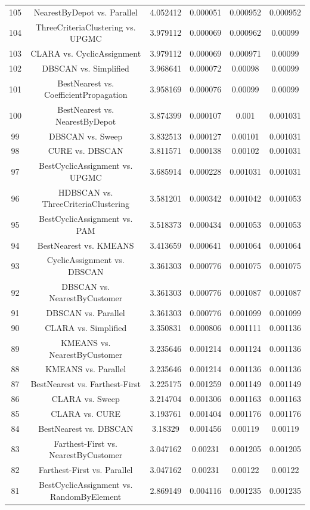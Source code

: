 \documentclass[a4paper,10pt]{article}
\begin{document}
\begin{landscape}
\begin{table}[!htp]
\begin{tabular}{cccccc}
105&NearestByDepot vs. Parallel&4.052412&0.000051&0.000952&0.000952\\
104&ThreeCriteriaClustering vs. UPGMC&3.979112&0.000069&0.000962&0.00099\\
103&CLARA vs. CyclicAssignment&3.979112&0.000069&0.000971&0.00099\\
102&DBSCAN vs. Simplified&3.968641&0.000072&0.00098&0.00099\\
101&BestNearest vs. CoefficientPropagation&3.958169&0.000076&0.00099&0.00099\\
100&BestNearest vs. NearestByDepot&3.874399&0.000107&0.001&0.001031\\
99&DBSCAN vs. Sweep&3.832513&0.000127&0.00101&0.001031\\
98&CURE vs. DBSCAN&3.811571&0.000138&0.00102&0.001031\\
97&BestCyclicAssignment vs. UPGMC&3.685914&0.000228&0.001031&0.001031\\
96&HDBSCAN vs. ThreeCriteriaClustering&3.581201&0.000342&0.001042&0.001053\\
95&BestCyclicAssignment vs. PAM&3.518373&0.000434&0.001053&0.001053\\
94&BestNearest vs. KMEANS&3.413659&0.000641&0.001064&0.001064\\
93&CyclicAssignment vs. DBSCAN&3.361303&0.000776&0.001075&0.001075\\
92&DBSCAN vs. NearestByCustomer&3.361303&0.000776&0.001087&0.001087\\
91&DBSCAN vs. Parallel&3.361303&0.000776&0.001099&0.001099\\
90&CLARA vs. Simplified&3.350831&0.000806&0.001111&0.001136\\
89&KMEANS vs. NearestByCustomer&3.235646&0.001214&0.001124&0.001136\\
88&KMEANS vs. Parallel&3.235646&0.001214&0.001136&0.001136\\
87&BestNearest vs. Farthest-First&3.225175&0.001259&0.001149&0.001149\\
86&CLARA vs. Sweep&3.214704&0.001306&0.001163&0.001163\\
85&CLARA vs. CURE&3.193761&0.001404&0.001176&0.001176\\
84&BestNearest vs. DBSCAN&3.18329&0.001456&0.00119&0.00119\\
83&Farthest-First vs. NearestByCustomer&3.047162&0.00231&0.001205&0.001205\\
82&Farthest-First vs. Parallel&3.047162&0.00231&0.00122&0.00122\\
81&BestCyclicAssignment vs. RandomByElement&2.869149&0.004116&0.001235&0.001235\\

\end{tabular}
\end{table}
\end{landscape}
\end{document}

